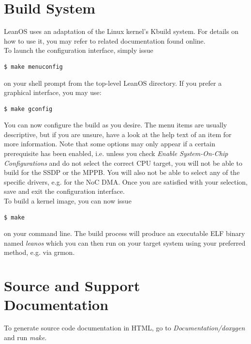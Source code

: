 \section {Build System}

LeanOS uses an adaptation of the Linux kernel's Kbuild system. For details on
how to use it, you may refer to related documentation found online. \\

\noindent
To launch the configuration interface, simply issue 

\begin{lstlisting}[language=bash]
  $ make menuconfig
\end{lstlisting}
\noindent
on your shell prompt from the top-level LeanOS directory. If you prefer a
graphical interface, you may use:

\begin{lstlisting}[language=bash]
  $ make gconfig
\end{lstlisting}

\noindent
You can now configure the build as you desire. The menu items are usually
descriptive, but if you are unsure, have a look at the help text of an item for
more information. Note that some options may only appear if a certain
prerequisite has been enabled, i.e. unless you check \emph{Enable
System-On-Chip Configurations} and do not select the correct CPU target, you
will not be able to build for the \gls{SSDP} or the \gls{MPPB}.  You will also
not be able to select any of the specific drivers, e.g. for the \gls{NoC}
\gls{DMA}. Once you are satisfied with your selection, save and exit the
configuration interface.\\

\noindent
To build a kernel image, you can now issue

\begin{lstlisting}[language=bash]
  $ make
\end{lstlisting}

\noindent
on your command line. The build process will produce an executable ELF binary
named \emph{leanos} which you can then run on your target system using your
preferred method, e.g. via grmon.



\section {Source and Support Documentation}

To generate source code documentation in HTML, go to \emph{Documentation/doxygen}
and run \emph{make}.\\

